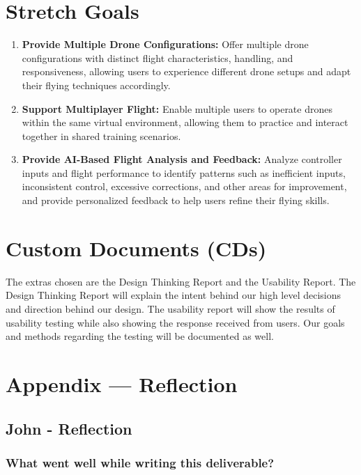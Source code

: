 \documentclass{article}
\begin{document}
\section{Stretch Goals}

\begin{enumerate}
    \item \textbf{Provide Multiple Drone Configurations:} Offer multiple drone configurations with distinct flight characteristics, handling, and responsiveness, allowing users to experience different drone setups and adapt their flying techniques accordingly.

    \item \textbf{Support Multiplayer Flight:} Enable multiple users to operate drones within the same virtual environment, allowing them to practice and interact together in shared training scenarios.

    \item \textbf{Provide AI-Based Flight Analysis and Feedback:} Analyze controller inputs and flight performance to identify patterns such as inefficient inputs, inconsistent control, excessive corrections, and other areas for improvement, and provide personalized feedback to help users refine their flying skills.
\end{enumerate}

\section{Custom Documents (CDs)}

The extras chosen are the Design Thinking Report and the Usability Report. The Design Thinking Report will explain the intent behind our high level decisions and direction behind our design. The usability report will show the results of usability testing while also showing the response received from users. Our goals and methods regarding the testing will be documented as well.

\newpage{}

\section*{Appendix --- Reflection}

% 

\subsection*{John - Reflection}
\subsubsection*{What went well while writing this deliverable?}
\end{document}

